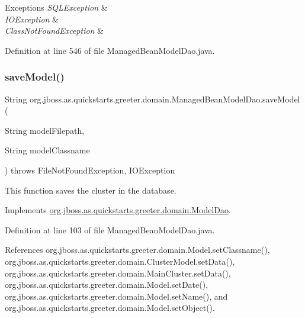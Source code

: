 \begin{DoxyExceptions}{Exceptions}
{\em S\+Q\+L\+Exception} & \\
\hline
{\em I\+O\+Exception} & \\
\hline
{\em Class\+Not\+Found\+Exception} & \\
\hline
\end{DoxyExceptions}


Definition at line 546 of file Managed\+Bean\+Model\+Dao.\+java.

\mbox{\label{classorg_1_1jboss_1_1as_1_1quickstarts_1_1greeter_1_1domain_1_1_managed_bean_model_dao_a5be76afee3c059eafe8e617578bc1f26}} 
\subsubsection{\texorpdfstring{save\+Model()}{saveModel()}}
{\footnotesize\ttfamily String org.\+jboss.\+as.\+quickstarts.\+greeter.\+domain.\+Managed\+Bean\+Model\+Dao.\+save\+Model (\begin{DoxyParamCaption}\item[{String}]{model\+Filepath,  }\item[{String}]{model\+Classname }\end{DoxyParamCaption}) throws File\+Not\+Found\+Exception, I\+O\+Exception}



This function saves the cluster in the database. 



Implements \hyperlink{interfaceorg_1_1jboss_1_1as_1_1quickstarts_1_1greeter_1_1domain_1_1_model_dao_acf8fb2e59848570f96989b86d8dad6c6}{org.\+jboss.\+as.\+quickstarts.\+greeter.\+domain.\+Model\+Dao}.



Definition at line 103 of file Managed\+Bean\+Model\+Dao.\+java.



References org.\+jboss.\+as.\+quickstarts.\+greeter.\+domain.\+Model.\+set\+Classname(), org.\+jboss.\+as.\+quickstarts.\+greeter.\+domain.\+Cluster\+Model.\+set\+Data(), org.\+jboss.\+as.\+quickstarts.\+greeter.\+domain.\+Main\+Cluster.\+set\+Data(), org.\+jboss.\+as.\+quickstarts.\+greeter.\+domain.\+Model.\+set\+Date(), org.\+jboss.\+as.\+quickstarts.\+greeter.\+domain.\+Model.\+set\+Name(), and org.\+jboss.\+as.\+quickstarts.\+greeter.\+domain.\+Model.\+set\+Object().

